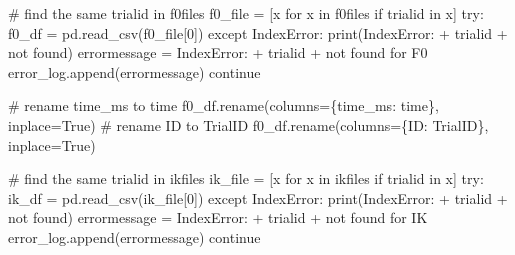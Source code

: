 \documentclass[
  letterpaper,
  DIV=11,
  numbers=noendperiod]{scrreprt}
\newenvironment{Shaded}{\begin{snugshade}}{\end{snugshade}}
\newcommand{\BuiltInTok}[1]{\textcolor[rgb]{0.00,0.23,0.31}{#1}}
\newcommand{\CommentTok}[1]{\textcolor[rgb]{0.37,0.37,0.37}{#1}}
\newcommand{\ControlFlowTok}[1]{\textcolor[rgb]{0.00,0.23,0.31}{#1}}
\newcommand{\DecValTok}[1]{\textcolor[rgb]{0.68,0.00,0.00}{#1}}
\newcommand{\KeywordTok}[1]{\textcolor[rgb]{0.00,0.23,0.31}{#1}}
\newcommand{\NormalTok}[1]{\textcolor[rgb]{0.00,0.23,0.31}{#1}}
\newcommand{\OperatorTok}[1]{\textcolor[rgb]{0.37,0.37,0.37}{#1}}
\newcommand{\PreprocessorTok}[1]{\textcolor[rgb]{0.68,0.00,0.00}{#1}}
\newcommand{\StringTok}[1]{\textcolor[rgb]{0.13,0.47,0.30}{#1}}
\newcommand{\VariableTok}[1]{\textcolor[rgb]{0.07,0.07,0.07}{#1}}
\begin{document}
\begin{Shaded}
\begin{Highlighting}[]
    \CommentTok{\# find the same trialid in f0files}
\NormalTok{    f0\_file }\OperatorTok{=}\NormalTok{ [x }\ControlFlowTok{for}\NormalTok{ x }\KeywordTok{in}\NormalTok{ f0files }\ControlFlowTok{if}\NormalTok{ trialid }\KeywordTok{in}\NormalTok{ x]}
    \ControlFlowTok{try}\NormalTok{:}
\NormalTok{        f0\_df }\OperatorTok{=}\NormalTok{ pd.read\_csv(f0\_file[}\DecValTok{0}\NormalTok{])}
    \ControlFlowTok{except} \PreprocessorTok{IndexError}\NormalTok{:}
        \BuiltInTok{print}\NormalTok{(}\StringTok{\textquotesingle{}IndexError: \textquotesingle{}} \OperatorTok{+}\NormalTok{ trialid }\OperatorTok{+} \StringTok{\textquotesingle{} not found\textquotesingle{}}\NormalTok{)}
\NormalTok{        errormessage }\OperatorTok{=} \StringTok{\textquotesingle{}IndexError: \textquotesingle{}} \OperatorTok{+}\NormalTok{ trialid }\OperatorTok{+} \StringTok{\textquotesingle{} not found for F0\textquotesingle{}}
\NormalTok{        error\_log.append(errormessage)}
        \ControlFlowTok{continue}

    \CommentTok{\# rename time\_ms to time}
\NormalTok{    f0\_df.rename(columns}\OperatorTok{=}\NormalTok{\{}\StringTok{\textquotesingle{}time\_ms\textquotesingle{}}\NormalTok{: }\StringTok{\textquotesingle{}time\textquotesingle{}}\NormalTok{\}, inplace}\OperatorTok{=}\VariableTok{True}\NormalTok{)}
    \CommentTok{\# rename ID to TrialID}
\NormalTok{    f0\_df.rename(columns}\OperatorTok{=}\NormalTok{\{}\StringTok{\textquotesingle{}ID\textquotesingle{}}\NormalTok{: }\StringTok{\textquotesingle{}TrialID\textquotesingle{}}\NormalTok{\}, inplace}\OperatorTok{=}\VariableTok{True}\NormalTok{)}

    \CommentTok{\# find the same trialid in ikfiles}
\NormalTok{    ik\_file }\OperatorTok{=}\NormalTok{ [x }\ControlFlowTok{for}\NormalTok{ x }\KeywordTok{in}\NormalTok{ ikfiles }\ControlFlowTok{if}\NormalTok{ trialid }\KeywordTok{in}\NormalTok{ x]}
    \ControlFlowTok{try}\NormalTok{:}
\NormalTok{        ik\_df }\OperatorTok{=}\NormalTok{ pd.read\_csv(ik\_file[}\DecValTok{0}\NormalTok{])}
    \ControlFlowTok{except} \PreprocessorTok{IndexError}\NormalTok{:}
        \BuiltInTok{print}\NormalTok{(}\StringTok{\textquotesingle{}IndexError: \textquotesingle{}} \OperatorTok{+}\NormalTok{ trialid }\OperatorTok{+} \StringTok{\textquotesingle{} not found\textquotesingle{}}\NormalTok{)}
\NormalTok{        errormessage }\OperatorTok{=} \StringTok{\textquotesingle{}IndexError: \textquotesingle{}} \OperatorTok{+}\NormalTok{ trialid }\OperatorTok{+} \StringTok{\textquotesingle{} not found for IK\textquotesingle{}}
\NormalTok{        error\_log.append(errormessage)}
        \ControlFlowTok{continue}


\end{Highlighting}
\end{Shaded}
\end{document}

